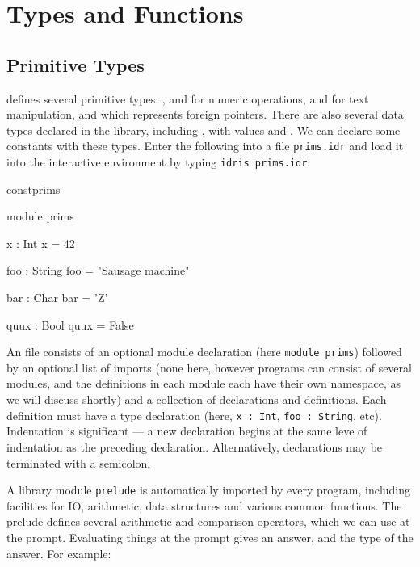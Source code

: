 \section{Types and Functions}

\subsection{Primitive Types}

\Idris{} defines several primitive types: ,  and
 for numeric operations,  and  for
text manipulation, and  which represents foreign pointers.
There are also several data types declared in the library, including
, with values  and .
We can declare some constants with these types. Enter the following
into a file \texttt{prims.idr} and load it into the \Idris{} interactive
environment by typing \texttt{idris prims.idr}:

\begin{SaveVerbatim}{constprims}

module prims

x : Int
x = 42

foo : String
foo = "Sausage machine"

bar : Char
bar = 'Z'

quux : Bool
quux = False

\end{SaveVerbatim}

\noindent
An \Idris{} file consists of an optional module declaration (here
\texttt{module prims}) followed by an optional list of imports (none here,
however \Idris{} programs can consist of several modules, and the definitions
in each module each have their own namespace, as we will discuss shortly) and a
collection of declarations and definitions. Each definition must have a type
declaration (here, \texttt{x : Int}, \texttt{foo : String}, etc).
Indentation is significant --- a new declaration begins at the same leve
of indentation as the preceding declaration. Alternatively, declarations
may be terminated with a semicolon.

A library module \texttt{prelude} is automatically imported by every \Idris{} program,
including facilities for IO, arithmetic, data structures and various common
functions. The prelude defines several arithmetic and comparison operators,
which we can use at the prompt. Evaluating things at the prompt gives an
answer, and the type of the answer. For example:

